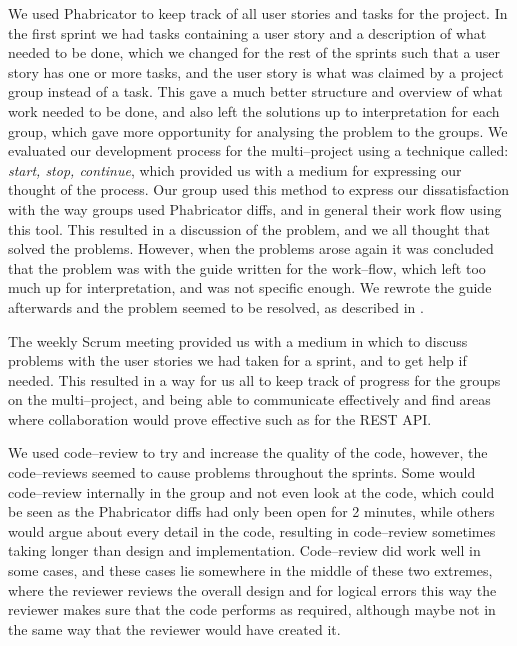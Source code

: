 We used Phabricator to keep track of all user stories and tasks for the project.
In the first sprint we had tasks containing a user story and a description of what needed to be done, which we changed for the rest of the sprints such that a user story has one or more tasks, and the user story is what was claimed by a project group instead of a task.
This gave a much better structure and overview of what work needed to be done, and also left the solutions up to interpretation for each group, which gave more opportunity for analysing the problem to the groups.
We evaluated our development process for the multi--project using a technique called: \textit{start, stop, continue}, which provided us with a medium for expressing our thought of the process.
Our group used this method to express our dissatisfaction with the way groups used Phabricator diffs, and in general their work flow using this tool.
This resulted in a discussion of the problem, and we all thought that solved the problems.
However, when the problems arose again it was concluded that the problem was with the guide written for the work--flow, which left too much up for interpretation, and was not specific enough.
We rewrote the guide afterwards and the problem seemed to be resolved, as described in .

The weekly Scrum meeting provided us with a medium in which to discuss problems with the user stories we had taken for a sprint, and to get help if needed.
This resulted in a way for us all to keep track of progress for the groups on the multi--project, and being able to communicate effectively and find areas where collaboration would prove effective such as for the REST API.

We used code--review to try and increase the quality of the code, however, the code--reviews seemed to cause problems throughout the sprints.
Some would code--review internally in the group and not even look at the code, which could be seen as the Phabricator diffs had only been open for 2 minutes, while others would argue about every detail in the code, resulting in code--review sometimes taking longer than design and implementation.
Code--review did work well in some cases, and these cases lie somewhere in the middle of these two extremes, where the reviewer reviews the overall design and for logical errors this way the reviewer makes sure that the code performs as required, although maybe not in the same way that the reviewer would have created it.

